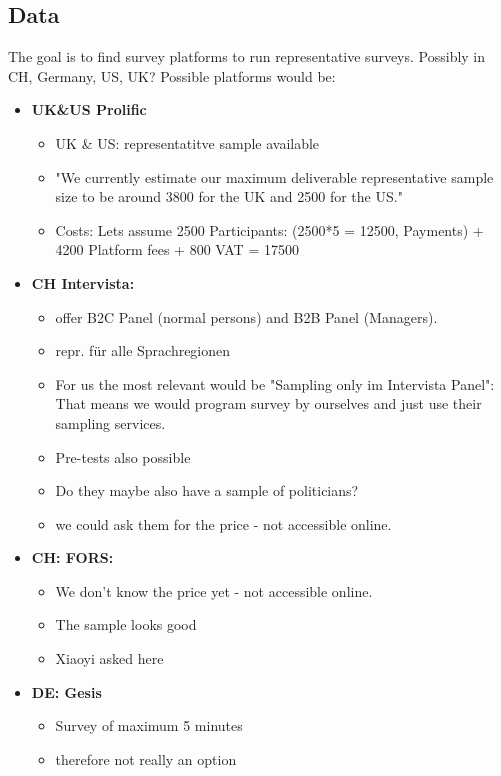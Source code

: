 \documentclass[a4paper, 12pt]{article}
\begin{document}
\subsection{Data}
The goal is to find survey platforms to run representative surveys. Possibly in CH, Germany, US, UK? Possible platforms would be: 
\begin{itemize}
    \item \textbf{UK\&US Prolific}
    \begin{itemize}
        \item UK \& US: representatitve sample available
        \item "We currently estimate our maximum deliverable representative sample size to be around 3800 for the UK and 2500 for the US."
        \item Costs: Lets assume 2500 Participants: (2500*5 = 12500, Payments) + 4200 Platform fees + 800 VAT = 17500  
    \end{itemize}
    \item \textbf{CH Intervista:} 
    \begin{itemize}
        \item offer B2C Panel (normal persons) and B2B Panel (Managers).
        \item repr. für alle Sprachregionen
        \item For us the most relevant would be "Sampling only im Intervista Panel": That means we would program survey by ourselves and just use their sampling services. 
        \item Pre-tests also possible 
        \item Do they maybe also have a sample of politicians?
        \item we could ask them for the price - not accessible online. 
    \end{itemize}
    \item \textbf{CH: FORS:} 
    \begin{itemize}
        \item We don't know the price yet - not accessible online. 
        \item The sample looks good
        \item Xiaoyi asked here
    \end{itemize}
    \item \textbf{DE: Gesis}
    \begin{itemize}
        \item Survey of maximum 5 minutes 
        \item therefore not really an option

\end{itemize}
\end{itemize}
\end{document}
